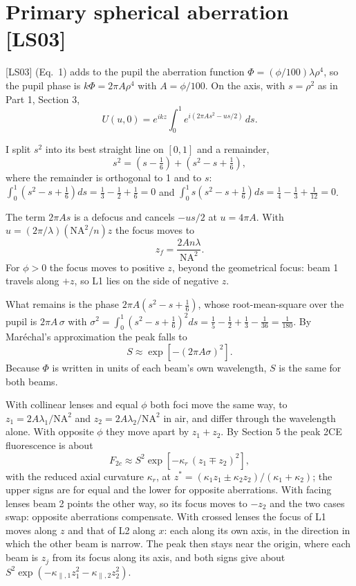 \documentclass[11pt]{article}
\begin{document}
\section{Primary spherical aberration [LS03]}
 [LS03] (Eq.~1) adds to the pupil the aberration function $\Phi = (\phi/100)\lambda\rho^4$, so the pupil phase is
$k\Phi = 2\pi A\rho^4$ with $A = \phi/100$. On the axis, with $s = \rho^2$ as in Part 1, Section 3,
\begin{equation}U(u, 0) = e^{ikz}\int_0^1 e^{i(2\pi As^2 - us/2)}\,ds .\end{equation}

 I split $s^2$ into its best straight line on $[0, 1]$ and a remainder,
\begin{equation}s^2 = \left(s - \tfrac16\right) + \left(s^2 - s + \tfrac16\right),\end{equation}
where the remainder is orthogonal to 1 and to $s$: $\int_0^1(s^2 - s + \frac16)ds = \frac13 - \frac12 + \frac16 = 0$ and
$\int_0^1s(s^2 - s + \frac16)ds = \frac14 - \frac13 + \frac1{12} = 0$.

 The term $2\pi As$ is a defocus and cancels $-us/2$ at $u = 4\pi A$. With
$u = (2\pi/\lambda)(\mathrm{NA}^2/n)z$ the focus moves to
\begin{equation}z_f = \frac{2An\lambda}{\mathrm{NA}^2} .\end{equation}
For $\phi > 0$ the focus moves to positive $z$, beyond the geometrical focus: beam 1 travels along $+z$, so L1 lies on the
side of negative $z$.

 What remains is the phase $2\pi A(s^2 - s + \frac16)$, whose root-mean-square over the pupil
is $2\pi A\,\sigma$ with $\sigma^2 = \int_0^1(s^2 - s + \frac16)^2ds = \frac15 - \frac12 + \frac13 - \frac1{36} = \frac1{180}$.
By Maréchal's approximation the peak falls to
\begin{equation}S \approx \exp[-(2\pi A\sigma)^2] .\end{equation}
Because $\Phi$ is written in units of each beam's own wavelength, $S$ is the same for both beams.

 With collinear lenses and equal $\phi$ both foci move the same way, to $z_1 = 2A\lambda_1/\mathrm{NA}^2$
and $z_2 = 2A\lambda_2/\mathrm{NA}^2$ in air, and differ through the wavelength alone. With opposite $\phi$ they move apart
by $z_1 + z_2$. By Section 5 the peak 2CE fluorescence is about
\begin{equation}F_{2c} \approx S^2\exp\!\left[-\kappa_r\,(z_1 \mp z_2)^2\right] ,\end{equation}
with the reduced axial curvature $\kappa_r$, at $z^* = (\kappa_1z_1 \pm \kappa_2z_2)/(\kappa_1 + \kappa_2)$; the upper
signs are for equal and the lower for opposite aberrations. With facing
lenses beam 2 points the other way, so its focus moves to $-z_2$ and the two cases swap: opposite aberrations compensate.
With crossed lenses the focus of L1 moves along $z$ and that of L2 along $x$: each along its own axis, in the
direction in which the other beam is narrow. The peak then stays near the origin, where each beam is $z_j$ from its
focus along its axis, and both signs give about $S^2\exp(-\kappa_{\parallel,1}z_1^2 - \kappa_{\parallel,2}z_2^2)$.
\end{document}
